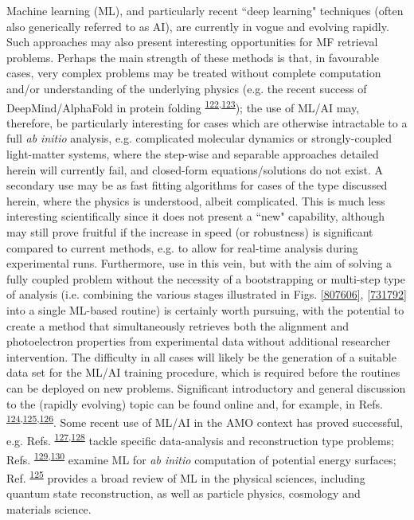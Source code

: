 \documentclass[10pt]{article}
\begin{document}
Machine learning (ML), and particularly recent ``deep learning" techniques (often also generically referred to as AI), are currently in vogue and evolving rapidly. Such approaches may also present interesting opportunities for MF retrieval problems. Perhaps the main strength of these methods is that, in favourable cases, very complex problems may be treated without complete computation and/or understanding of the underlying physics (e.g. the recent success of DeepMind/AlphaFold in protein folding \textsuperscript{\hyperref[csl:122]{122},\hyperref[csl:123]{123}}); the use of ML/AI may, therefore, be particularly interesting for cases which are otherwise intractable to a full \textit{ab initio} analysis, e.g. complicated molecular dynamics or strongly-coupled light-matter systems, where the step-wise and separable approaches detailed herein will currently fail, and closed-form equations/solutions do not exist. A secondary use may be as fast fitting algorithms for cases of the type discussed herein, where the physics is understood, albeit complicated. This is much less interesting scientifically since it does not present a ``new" capability, although may still prove fruitful if the increase in speed (or robustness) is significant compared to current methods, e.g. to allow for real-time analysis during experimental runs. Furthermore, use in this vein, but with the aim of solving a fully coupled problem without the necessity of a bootstrapping or multi-step type of analysis (i.e. combining the various stages illustrated in Figs. \ref{807606}, \ref{731792} into a single ML-based routine) is certainly worth pursuing, with the potential to create a method that simultaneously retrieves both the alignment and photoelectron properties from experimental data without additional researcher intervention. The difficulty in all cases will likely be the generation of a suitable data set for the ML/AI training procedure, which is required before the routines can be deployed on new problems. Significant introductory and general discussion to the (rapidly evolving) topic can be found online and, for example, in Refs. \textsuperscript{\hyperref[csl:124]{124},\hyperref[csl:125]{125},\hyperref[csl:126]{126}}. Some recent use of ML/AI in the AMO context has proved successful, e.g. Refs. \textsuperscript{\hyperref[csl:127]{127},\hyperref[csl:128]{128}} tackle specific data-analysis and reconstruction type problems; Refs. \textsuperscript{\hyperref[csl:129]{129},\hyperref[csl:130]{130}} examine ML for \textit{ab initio} computation of potential energy surfaces; Ref. \textsuperscript{\hyperref[csl:125]{125}} provides a broad review of ML in the physical sciences, including quantum state reconstruction, as well as particle physics, cosmology and materials science.
\end{document}
